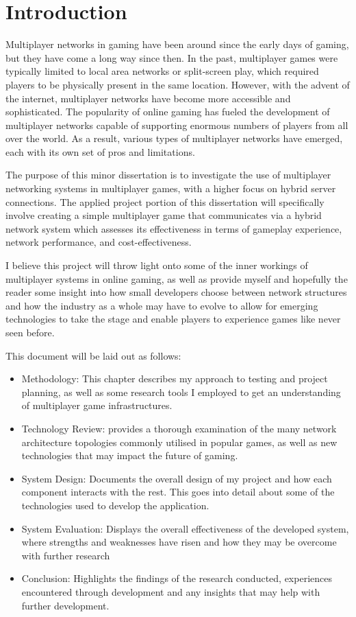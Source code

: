 \chapter{Introduction}

Multiplayer networks in gaming have been around since the early days of gaming, but they have come a long way since then. In the past, multiplayer games were typically limited to local area networks or split-screen play, which required players to be physically present in the same location. However, with the advent of the internet, multiplayer networks have become more accessible and sophisticated.
The popularity of online gaming has fueled the development of multiplayer networks capable of supporting enormous numbers of players from all over the world. As a result, various types of multiplayer networks have emerged, each with its own set of pros and limitations.

The purpose of this minor dissertation is to investigate the use of multiplayer networking systems in multiplayer games, with a higher focus on hybrid server connections. The applied project portion of this dissertation will specifically involve creating a simple multiplayer game that communicates via a hybrid network system which assesses its effectiveness in terms of gameplay experience, network performance, and cost-effectiveness.

I believe this project will throw light onto some of the inner workings of multiplayer systems in online gaming, as well as provide myself and hopefully the reader some insight into how small developers choose between network structures and how the industry as a whole may have to evolve to allow for emerging technologies to take the stage and enable players to experience games like never seen before.

This document will be laid out as follows:

\begin{itemize}
    \item Methodology: This chapter describes my approach to testing and project planning, as well as some research tools I employed to get an understanding of multiplayer game infrastructures.
    \item Technology Review: provides a thorough examination of the many network architecture topologies commonly utilised in popular games, as well as new technologies that may impact the future of gaming.
    \item System Design: Documents the overall design of my project and how each component interacts with the rest. This goes into detail about some of the technologies used to develop the application.
    \item System Evaluation: Displays the overall effectiveness of the developed system, where strengths and weaknesses have risen and how they may be overcome with further research
    \item Conclusion: Highlights the findings of the research conducted, experiences encountered through development and any insights that may help with further development.
\end{itemize}



